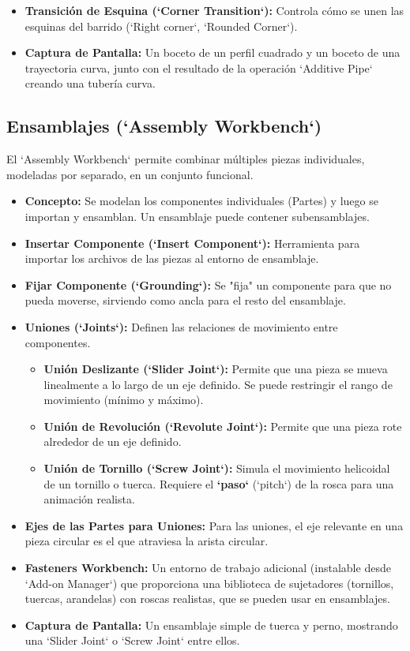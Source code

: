 \documentclass[12pt]{article}
\begin{document}
\begin{itemize}[label=\textbullet]
\begin{itemize}[label=\textendash]
\begin{itemize}[label=\textendash]
        \end{itemize}
        \item \textbf{Transición de Esquina (`Corner Transition`):} Controla cómo se unen las esquinas del barrido (`Right corner`, `Rounded Corner`).
        \item \textbf{Captura de Pantalla:} Un boceto de un perfil cuadrado y un boceto de una trayectoria curva, junto con el resultado de la operación `Additive Pipe` creando una tubería curva.
    \end{itemize}
\end{itemize}

\subsection{Ensamblajes (`Assembly Workbench`)}
El `Assembly Workbench` permite combinar múltiples piezas individuales, modeladas por separado, en un conjunto funcional.
\begin{itemize}[label=\textbullet]
    \item \textbf{Concepto:} Se modelan los componentes individuales (Partes) y luego se importan y ensamblan. Un ensamblaje puede contener subensamblajes.
    \item \textbf{Insertar Componente (`Insert Component`):} Herramienta para importar los archivos de las piezas al entorno de ensamblaje.
    \item \textbf{Fijar Componente (`Grounding`):} Se "fija" un componente para que no pueda moverse, sirviendo como ancla para el resto del ensamblaje.
    \item \textbf{Uniones (`Joints`):} Definen las relaciones de movimiento entre componentes.
    \begin{itemize}[label=\textendash]
        \item \textbf{Unión Deslizante (`Slider Joint`):} Permite que una pieza se mueva linealmente a lo largo de un eje definido. Se puede restringir el rango de movimiento (mínimo y máximo).
        \item \textbf{Unión de Revolución (`Revolute Joint`):} Permite que una pieza rote alrededor de un eje definido.
        \item \textbf{Unión de Tornillo (`Screw Joint`):} Simula el movimiento helicoidal de un tornillo o tuerca. Requiere el \textbf{`paso`} (`pitch`) de la rosca para una animación realista.
    \end{itemize}
    \item \textbf{Ejes de las Partes para Uniones:} Para las uniones, el eje relevante en una pieza circular es el que atraviesa la arista circular.
    \item \textbf{Fasteners Workbench:} Un entorno de trabajo adicional (instalable desde `Add-on Manager`) que proporciona una biblioteca de sujetadores (tornillos, tuercas, arandelas) con roscas realistas, que se pueden usar en ensamblajes.
    \item \textbf{Captura de Pantalla:} Un ensamblaje simple de tuerca y perno, mostrando una `Slider Joint` o `Screw Joint` entre ellos.
\end{itemize}
\end{document}
